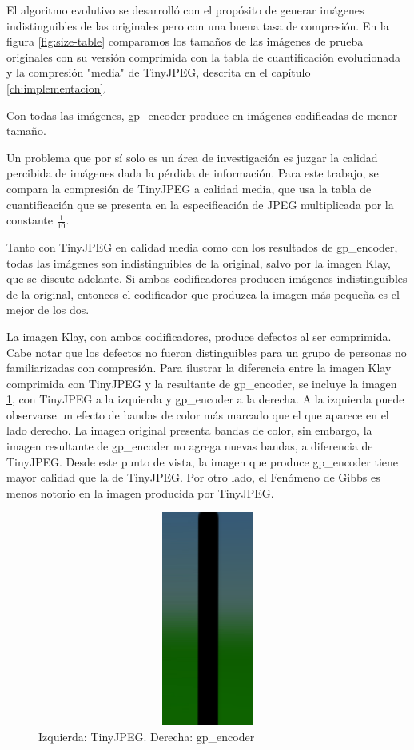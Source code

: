 El algoritmo evolutivo se desarrolló con el propósito de generar imágenes
indistinguibles de las originales pero con una buena tasa de compresión. En la
figura \ref{fig:size-table} comparamos los tamaños de las imágenes de prueba
originales con su versión comprimida con la tabla de cuantificación
evolucionada y la compresión "media" de TinyJPEG, descrita en el capítulo
\ref{ch:implementacion}.

Con todas las imágenes, gp\_encoder produce en imágenes codificadas de menor
tamaño.

Un problema que por sí solo es un área de investigación \cite{subjective-paper}
es juzgar la calidad percibida de imágenes dada la pérdida de información. Para
este trabajo, se compara la compresión de TinyJPEG a calidad media, que usa la
tabla de cuantificación que se presenta en la especificación de JPEG
multiplicada por la constante $\frac{1}{10}$.

Tanto con TinyJPEG en calidad media como con los resultados de gp\_encoder,
todas las imágenes son indistinguibles de la original, salvo por la imagen
Klay, que se discute adelante. Si ambos codificadores producen imágenes
indistinguibles de la original, entonces el codificador que produzca la imagen más
pequeña es el mejor de los dos.

La imagen Klay, con ambos codificadores, produce defectos al ser comprimida.
Cabe notar que los defectos no fueron distinguibles para un grupo de personas
no familiarizadas con compresión. Para ilustrar la diferencia entre la
imagen Klay comprimida con TinyJPEG y la resultante de gp\_encoder, se incluye
la imagen \ref{img:banding}, con TinyJPEG a la izquierda y gp\_encoder a la
derecha. A la izquierda puede observarse un efecto de bandas de color más
marcado que el que aparece en el lado derecho. La imagen original presenta bandas de
color, sin embargo, la imagen resultante de gp\_encoder no agrega nuevas
bandas, a diferencia de TinyJPEG. Desde este punto de vista, la imagen que
produce gp\_encoder tiene mayor calidad que la de TinyJPEG. Por otro lado, el
Fenómeno de Gibbs es menos notorio en la imagen producida por TinyJPEG.

\begin{figure}
    \includegraphics[width=400pt, height=200pt]{banding}
    \caption{Izquierda: TinyJPEG. Derecha: gp\_encoder}
    \label{img:banding}
\end{figure}

